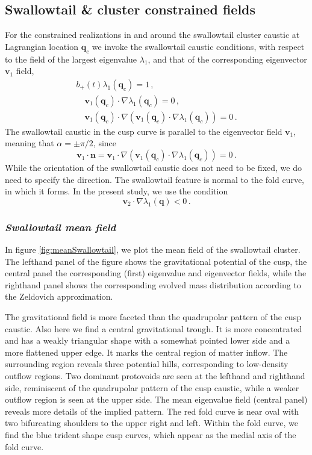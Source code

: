\documentclass[a4paper, 11pt]{article}
\begin{document}
\subsection{Swallowtail \& cluster constrained fields}
For the constrained realizations in and around the swallowtail cluster caustic at Lagrangian location $\bm{q}_c$ we invoke the swallowtail caustic conditions, with respect to the field of the largest eigenvalue $\lambda_1$, and that of the corresponding eigenvector $\bm{v}_1$ field,
\begin{align}
b_+(t) \lambda_1(\bm{q}_c) = 1\,,\\
\quad \bm{v}_1(\bm{q}_c) \cdot \nabla\lambda_1(\bm{q}_c) = 0\,,\\
 \quad\bm{v}_1(\bm{q}_c)\cdot \nabla( \bm{v}_1(\bm{q}_c) \cdot \nabla\lambda_1(\bm{q}_c)) = 0\,.
\end{align}
The swallowtail caustic in the cusp curve is parallel to the eigenvector field $\bm{v}_1$, meaning that $\alpha = \pm \pi/2$, since
\begin{equation}
\bm{v}_1 \cdot \bm{n}= \bm{v}_1 \cdot \nabla(\bm{v}_1(\bm{q}_c) \cdot \nabla\lambda_1(\bm{q}_c))  =0\,.
\end{equation}
While the orientation of the swallowtail caustic does not need to be fixed, we do need to specify the direction. The swallowtail feature is normal to the fold curve, in which it forms. In the present study, we use the condition
\begin{equation}
  \bm{v}_2 \cdot \nabla \lambda_1(\bm{q}) <0\,.
  \end{equation}

\subsubsection{{\it Swallowtail mean field}}
In figure \ref{fig:meanSwallowtail}, we plot the mean field of the swallowtail cluster. The lefthand panel of the figure shows the gravitational potential of the cusp, the central panel the corresponding (first) eigenvalue and eigenvector fields, while the righthand panel shows the corresponding evolved mass distribution according to the Zeldovich approximation.

The gravitational field is more faceted than the quadrupolar pattern of the cusp caustic. Also here we find a central gravitational trough. It is more concentrated and has a weakly triangular shape with a somewhat pointed lower side and a more flattened upper edge. It marks the central region of matter inflow. The surrounding region reveals three potential hills, corresponding to low-density outflow regions. Two dominant protovoids are seen at the lefthand and righthand side, reminiscent of the quadrupolar pattern of the cusp caustic, while a weaker outflow region is seen at the upper side. The mean eigenvalue field (central panel) reveals more details of the implied pattern. The red fold curve is near oval with two bifurcating shoulders to the upper right and left. Within the fold curve, we find the blue trident shape cusp curves, which appear as the medial axis of the fold curve.
\end{document}

